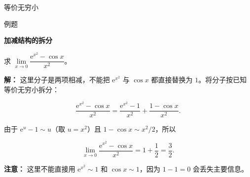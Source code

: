 \documentclass[aspectratio=169,10pt,fontset=fandol]{ctexbeamer}
\newcommand{\ee}{\mathrm{e}}
\begin{document}
\begin{frame}[t,fragile]{等价无穷小}
\normalsize
\begin{block}{例题}
{\normalsize
\textbf{加减结构的拆分}\par


求 \(\lim\limits_{x \to 0} \dfrac{\ee^{x^2} - \cos x}{x^2}\)。


}
\end{block}
\pause
{\normalsize
\textbf{解：}
这里分子是两项相减，不能把 \(\ee^{x^2}\) 与 \(\cos x\) 都直接替换为 \(1\)。将分子按已知等价无穷小拆分：

\[

\frac{\ee^{x^2}-\cos x}{x^2}

=\frac{\ee^{x^2}-1}{x^2}+\frac{1-\cos x}{x^2}.

\]

由于 \(\ee^u-1\sim u\)（取 \(u=x^2\)）且 \(1-\cos x\sim x^2/2\)，所以

\[

\lim_{x\to0}\frac{\ee^{x^2}-\cos x}{x^2}

=1+\frac12=\frac32.

\]



\textbf{注意：} 这里不能直接用 \(\ee^{x^2}\sim1\) 和 \(\cos x\sim1\)，因为 \(1-1=0\) 会丢失主要信息。


}
\end{frame}
\end{document}
